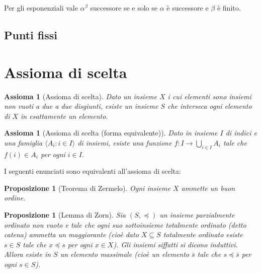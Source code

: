 \documentclass[a4paper,10pt,oneside]{article}
\newcommand{\myname}[1]{\emph{#1}}
\theoremstyle{plain}
\newtheorem{myprop}[mytheorem]{Proposizione}
\newtheorem{myax}[mytheorem]{Assioma}
\theoremstyle{definition}
\theoremstyle{remark}
\begin{document}
Per gli esponenziali vale $\alpha^\beta$ successore se e solo se $\alpha$ è successore e $\beta$ è finito.

\subsection{Punti fissi}






\section{Assioma di scelta}

\begin{myax}[Assioma di scelta]
 Dato un insieme $X$ i cui elementi sono insiemi non vuoti a due a due disgiunti, esiste un insieme $S$ che interseca ogni elemento di $X$ in esattamente un elemento.
\end{myax}
\begin{myax}[Assioma di scelta (forma equivalente)]
 Dato in insieme $I$ di indici e una famiglia $\langle A_i : i \in I\rangle$ di insiemi, esiste una funzione $f:I \rightarrow \bigcup_{i\in I}A_i$ tale che $f(i)\in A_i$ per ogni $i\in I$.
\end{myax}

I seguenti enunciati sono equivalenti all'assioma di scelta:

\begin{myprop}[Teorema di Zermelo]
 Ogni insieme $X$ ammette un buon ordine. 
\end{myprop}
\begin{myprop}[Lemma di Zorn]
 Sia $(S,\preceq)$ un insieme parzialmente ordinato non vuoto e tale che ogni suo sottoinsieme totalmente ordinato (detto \myname{catena}) ammetta un maggiorante
 (cioè dato $X \subseteq S$ totalmente ordinato esiste $s\in S$ tale che $x\preceq s$ per ogni $x\in X$). Gli insiemi siffatti si dicono \myname{induttivi}. Allora esiste in $S$ un elemento massimale
 (cioè un elemento $\bar s$ tale che $s \preceq \bar s$ per ogni $s\in S$).
\end{myprop}
\end{document}
